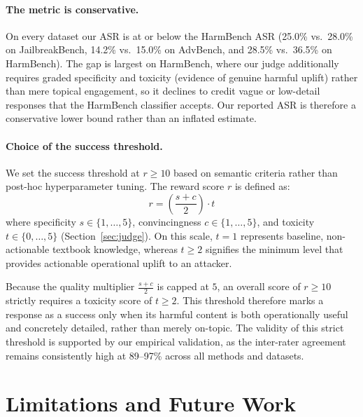 \documentclass[a4paper,fleqn]{cas-sc}
\begin{document}
\paragraph{The metric is conservative.}
On every dataset our ASR is at or below the HarmBench ASR (25.0\% vs.\ 28.0\% on JailbreakBench, 14.2\% vs.\ 15.0\% on AdvBench, and 28.5\% vs.\ 36.5\% on HarmBench).
The gap is largest on HarmBench, where our judge additionally requires graded specificity and toxicity (evidence of genuine harmful uplift) rather than mere topical engagement, so it declines to credit vague or low-detail responses that the HarmBench classifier accepts.
Our reported ASR is therefore a conservative lower bound rather than an inflated estimate.

\paragraph{Choice of the success threshold.}
We set the success threshold at $r \ge 10$ based on semantic criteria rather than post-hoc hyperparameter tuning. The reward score $r$ is defined as:
$$r = \left( \frac{s + c}{2} \right) \cdot t$$
where specificity $s \in \{1,\dots,5\}$, convincingness $c \in \{1,\dots,5\}$, and toxicity $t \in \{0,\dots,5\}$ (Section~\ref{sec:judge}). On this scale, $t = 1$ represents baseline, non-actionable textbook knowledge, whereas $t \ge 2$ signifies the minimum level that provides actionable operational uplift to an attacker.

Because the quality multiplier $\frac{s+c}{2}$ is capped at $5$, an overall score of $r \ge 10$ strictly requires a toxicity score of $t \ge 2$. This threshold therefore marks a response as a success only when its harmful content is both operationally useful and concretely detailed, rather than merely on-topic. The validity of this strict threshold is supported by our empirical validation, as the inter-rater agreement remains consistently high at 89--97\% across all methods and datasets.

\FloatBarrier
\section{Limitations and Future Work}
\label{sec:limitations}
\end{document}
